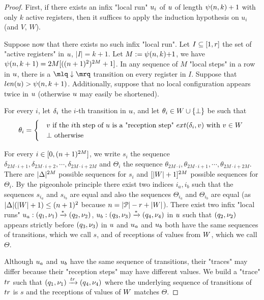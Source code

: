 \begin{proof}
	
	First, if there exists an infix "local run" $u_i$ of $u$ of length $\psi(n,k)+1$ with only $k$ active registers, then it suffices to apply the induction hypothesis on $u_i$ (and $V$, $W$).
	
	Suppose now that there exists no such infix "local run".
	Let $I \subseteq [1,r]$ the set of "active registers" in $u$, $|I| = k+1$. Let $M:= \psi(n,k){+}1$, we have $\psi(n,k+1) = 2M [((n+1)^2)^{2M}+1]$. 
	In any sequence of $M$ "local steps" in a row in $u$, 
	there is a $\quotemarks{\enregact}$ transition on every register in $I$. Suppose that $\length{\localrun} > \towerfun(n,k+1)$. Additionally, suppose that  no local configuration appears twice in $u$ (otherwise $u$ may easily be shortened). 
	
	
	For every $i$, let $\delta_i$ the $i$-th transition in $u$, and let $\theta_i\in W \cup \{\bot\}$ be such that 
	\[
	\theta_i = 
	\begin{cases}
		& 	v \text{ if the $i$th step of $u$ is a "reception step" $\extlabel{\delta_i}{v}$ with $v \in \Vinit$ } \\ 
		& 	\bot \text{ otherwise}
	\end{cases}
	\]

	For every $i \in [0,(n+1)^{2M}]$, we write $s_i$ the sequence $\delta_{2  M \cdot i+1}, \delta_{2  M \cdot i+2}, \cdots, \delta_{2 M \cdot i+2M}$ and $\Theta_i$ the sequence $\theta_{2  M \cdot i}, \theta_{2 M \cdot i+1}, \cdots, \theta_{2 M \cdot i+2M}$.
	There are $|\Delta|^{2M}$ possible sequences for $s_i$ and $[|W| +1]^{2M}$ possible sequences for $\Theta_i$.
	By the pigeonhole principle there exist two indices $i_a, i_b$ such that the sequences $s_{i_a}$ and $s_{i_b}$ are equal and also the sequences $\Theta_{i_a}$ and $\Theta_{i_b}$ are equal (as $|\Delta| (|W|+1) \leq (n+1)^2$ because $n=|\mathcal{P}| -r + |W|$). 
	There exist two infix "local runs" $u_a: (q_1, \nu_1) \xrightarrow{*} (q_2, \nu_2)$, $u_b: (q_3, \nu_3) \xrightarrow{*} (q_4, \nu_4)$ in $u$ such that $(q_2,\nu_2)$ appears strictly before $(q_3,\nu_3)$ in $u$ and $u_a$ and $u_b$ both have the same sequences of transitions, which we call $s$, and of receptions of values from $W$, which we call $\Theta$.
	
	Although $u_a$ and $u_b$ have the same sequence of transitions, their "traces" may differ because their "reception steps" may have different values.
	We build a "trace" $\atrace$ such that $(q_1,\localdata_1) \step{\atrace} (q_4, \localdata_4)$ where the underlying sequence of transitions of $\atrace$ is $s$ and the receptions of values of $W$ matches $\Theta$.
	

\end{proof}

